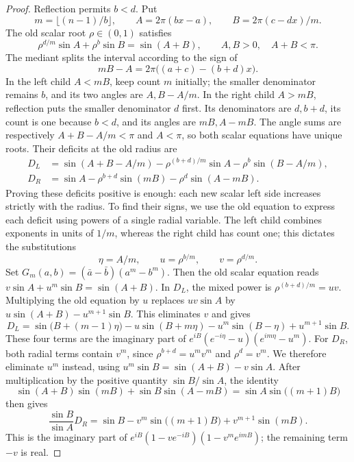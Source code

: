 \documentclass[10pt,a4paper]{amsart}
\begin{document}
\begin{proof}
Reflection permits $b<d$.  Put
\[
 m=\lfloor(n-1)/b\rfloor,\qquad
 A=2\pi(bx-a),\qquad B=2\pi(c-dx)/m.
\]
The old scalar root $\rho\in(0,1)$ satisfies
\begin{equation}\label{eq:old-mediant-scalar}
 \rho^{d/m}\sin A+\rho^b\sin B=\sin(A+B),
 \qquad A,B>0,\quad A+B<\pi.
\end{equation}
The mediant splits the interval according to the sign of
\[
 mB-A=2\pi\bigl((a+c)-(b+d)x\bigr).
\]
In the left child $A<mB$, keep count $m$ initially; the smaller denominator
remains $b$, and its two angles are $A,B-A/m$.
In the right child $A>mB$, reflection puts the smaller denominator $d$
first.  Its denominators are $d,b+d$, its count is one because $b<d$,
and its angles are $mB,A-mB$.  The angle sums are respectively
$A+B-A/m<\pi$ and $A<\pi$, so both scalar equations have unique roots.
Their deficits at the old radius are
\begin{align*}
 D_L&=\sin(A+B-A/m)-\rho^{(b+d)/m}\sin A
                            -\rho^b\sin(B-A/m),\\
 D_R&=\sin A-\rho^{b+d}\sin(mB)-\rho^d\sin(A-mB).
\end{align*}
Proving these deficits positive is enough: each new scalar left side
increases strictly with the radius. To find their signs, we use the old
equation to express each deficit using powers of a single radial variable. The left
child combines exponents in units of $1/m$, whereas the right child
has count one; this dictates the substitutions
\[
 \eta=A/m,\qquad u=\rho^{b/m},\qquad v=\rho^{d/m}.
\]
Set $G_m(a,b)=(\bar a-\bar b)(a^m-b^m)$.
Then the old scalar equation reads
$v\sin A+u^m\sin B=\sin(A+B)$.
In $D_L$, the mixed power is $\rho^{(b+d)/m}=uv$.
Multiplying the old equation by $u$ replaces $uv\sin A$ by
$u\sin(A+B)-u^{m+1}\sin B$. This eliminates $v$ and gives
\[
 D_L=\sin\bigl(B+(m-1)\eta\bigr)-u\sin(B+m\eta)
       -u^m\sin(B-\eta)+u^{m+1}\sin B.
\]
These four terms are the imaginary part of
$e^{iB}(e^{-i\eta}-u)(e^{im\eta}-u^m)$.
For $D_R$, both radial terms contain $v^m$, since
$\rho^{b+d}=u^mv^m$ and $\rho^d=v^m$. We therefore eliminate $u^m$
instead, using
$u^m\sin B=\sin(A+B)-v\sin A$.
After multiplication by the positive quantity $\sin B/\sin A$, the identity
\[
 \sin(A+B)\sin(mB)+\sin B\sin(A-mB)
       =\sin A\sin\bigl((m+1)B\bigr)
\]
then gives
\[
 \frac{\sin B}{\sin A}D_R
   =\sin B-v^m\sin\bigl((m+1)B\bigr)+v^{m+1}\sin(mB).
\]
This is the imaginary part of
$e^{iB}(1-ve^{-iB})(1-v^me^{imB})$; the remaining term $-v$ is real.

\end{proof}
\end{document}
